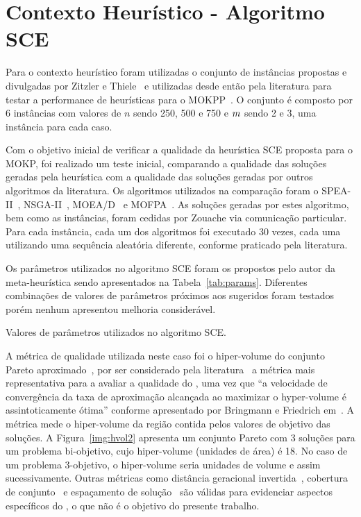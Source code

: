 \section{Contexto Heurístico - Algoritmo SCE}

Para o contexto heurístico foram utilizadas o conjunto de instâncias propostas
e divulgadas por Zitzler e Thiele~\cite{zitzler1998multiobjective} e utilizadas desde então
pela literatura para testar a performance de heurísticas para o MOKPP~\cite{zitzler2001spea2,deb2002fast, zhang2007moea, zouache2018cooperative}.
O conjunto é composto por 6 instâncias com valores de $n$ sendo 250, 500 e 750 e
$m$ sendo 2 e 3, uma instância para cada caso.

Com o objetivo inicial de verificar a qualidade da heurística SCE proposta para o MOKP,
foi realizado um teste inicial, comparando a qualidade das soluções geradas pela heurística
com a qualidade das soluções geradas por outros algoritmos da literatura.
Os algoritmos utilizados na comparação foram o SPEA-II~\cite{zitzler2001spea2},
NSGA-II~\cite{deb2002fast}, MOEA/D~\cite{zhang2007moea} e MOFPA~\cite{zouache2018cooperative}.
As soluções geradas por estes algoritmo, bem como as instâncias, foram
cedidas por Zouache via comunicação particular.
Para cada instância, cada um dos algoritmos foi executado 30 vezes, cada uma utilizando
uma sequência aleatória diferente, conforme praticado pela literatura.

Os parâmetros utilizados no algoritmo SCE foram os propostos pelo autor da meta-heurística
sendo apresentados na Tabela~\ref{tab:params}.
Diferentes combinações de valores de parâmetros próximos aos sugeridos foram testados
porém nenhum apresentou melhoria considerável.

\begin{table}[]
  \centering
  
  \caption{Valores de parâmetros utilizados no algoritmo SCE.}
  \label{tab:params}
\end{table}

A métrica de qualidade utilizada neste caso foi o hiper-volume do conjunto Pareto
aproximado~\cite{fonseca2006improved},
por ser considerado pela literatura~\cite{schutze2016hypervolume,beume2007sms}
a métrica mais representativa para a avaliar a qualidade do \paretoset{},
uma vez que ``a velocidade de convergência da taxa de aproximação alcançada
ao maximizar o hyper-volume é assintoticamente ótima''
conforme apresentado por Bringmann e Friedrich em~\cite{bringmann2010maximum}.
A métrica mede o hiper-volume da região contida pelos valores de objetivo das soluções.
A Figura~\ref{img:hvol2} apresenta um conjunto Pareto com 3 soluções para um problema 
bi-objetivo, cujo hiper-volume (unidades de área) é 18.
No caso de um problema 3-objetivo, o hiper-volume seria unidades de volume e assim sucessivamente.
Outras métricas como distância geracional invertida~\cite{van1998multiobjective},
cobertura de conjunto~\cite{zitzler1998multiobjective}
e espaçamento de solução~\cite{schott1995fault} são válidas para evidenciar
aspectos específicos do \paretoset{}, o que não é o objetivo do presente trabalho.

